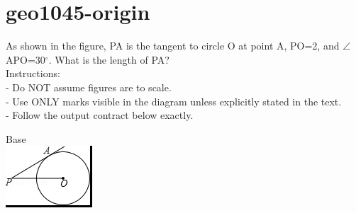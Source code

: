 \documentclass[12pt]{article}
\begin{document}
\section*{geo1045-origin}
\noindent\begin{minipage}{\textwidth}
\setlength{\parskip}{4pt}
As shown in the figure, PA is the tangent to circle O at point A, PO=2, and \ensuremath{\angle }APO=30\ensuremath{^\circ}. What is the length of PA?\\
Instructions:\\
- Do NOT assume figures are to scale.\\
- Use ONLY marks visible in the diagram unless explicitly stated in the text.\\
- Follow the output contract below exactly.\\
\end{minipage}
\begin{center}
\begin{minipage}{0.32\textwidth}\centering
Base\\
\includegraphics[width=0.95\linewidth]{out_rommath_origin/items/geo1045-origin/assets/figure.png}
\end{minipage}
\par
\end{center}
\bigskip
\end{document}
